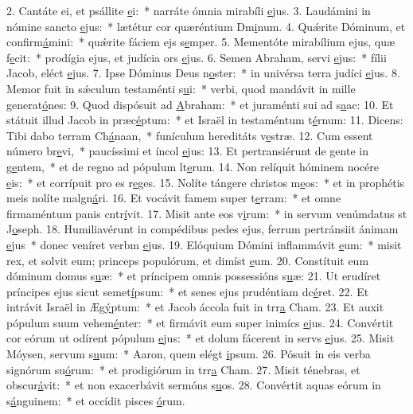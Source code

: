 2. Cantáte ei, et psállite \uline{e}i:~* narráte ómnia mirabíli \uline{e}jus.
3. Laudámini in nómine sancto \uline{e}jus:~* lætétur cor quæréntium Dm\uline{i}num.
4. Quǽrite Dóminum, et confirm\uline{á}mini:~* quǽrite fáciem ejs s\uline{e}mper.
5. Mementóte mirabílium ejus, quæ f\uline{e}cit:~* prodígia ejus, et judícia ors \uline{e}jus.
6. Semen Abraham, servi \uline{e}jus:~* fílii Jacob, eléct \uline{e}jus.
7. Ipse Dóminus Deus n\uline{o}ster:~* in univérsa terra judíci \uline{e}jus.
8. Memor fuit in sǽculum testaménti s\uline{u}i:~* verbi, quod mandávit in mille generat\uline{ó}nes:
9. Quod dispósuit ad \uline{A}braham:~* et juraménti sui ad s\uline{a}ac:
10. Et státuit illud Jacob in præc\uline{é}ptum:~* et Israël in testaméntum t\uline{é}rnum:
11. Dicens: Tibi dabo terram Ch\uline{á}naan,~* funículum hereditáts v\uline{e}stræ.
12. Cum essent número br\uline{e}vi,~* paucíssimi et íncol \uline{e}jus:
13. Et pertransiérunt de gente in g\uline{e}ntem,~* et de regno ad pópulum lt\uline{e}rum.
14. Non relíquit hóminem nocére \uline{e}is:~* et corrípuit pro es r\uline{e}ges.
15. Nolíte tángere christos m\uline{e}os:~* et in prophétis meis nolíte malgn\uline{á}ri.
16. Et vocávit famem super t\uline{e}rram:~* et omne firmaméntum panis cntr\uline{í}vit.
17. Misit ante eos v\uline{i}rum:~* in servum venúmdatus st J\uline{o}seph.
18. Humiliavérunt in compédibus pedes ejus, ferrum pertránsiit ánimam \uline{e}jus~* donec veníret verbm \uline{e}jus.
19. Elóquium Dómini inflammávit \uline{e}um:~* misit rex, et solvit eum; princeps populórum, et dimíst \uline{e}um.
20. Constítuit eum dóminum domus s\uline{u}æ:~* et príncipem omnis possessións s\uline{u}æ:
21. Ut erudíret príncipes ejus sicut semet\uline{í}psum:~* et senes ejus prudéntiam dc\uline{é}ret.
22. Et intrávit Israël in Æg\uline{ý}ptum:~* et Jacob áccola fuit in trr\uline{a} Cham.
23. Et auxit pópulum suum vehem\uline{é}nter:~* et firmávit eum super inimícs \uline{e}jus.
24. Convértit cor eórum ut odírent pópulum \uline{e}jus:~* et dolum fácerent in servs \uline{e}jus.
25. Misit Móysen, servum s\uline{u}um:~* Aaron, quem elégt \uline{i}psum.
26. Pósuit in eis verba signórum su\uline{ó}rum:~* et prodigiórum in trr\uline{a} Cham.
27. Misit ténebras, et obscur\uline{á}vit:~* et non exacerbávit sermóns s\uline{u}os.
28. Convértit aquas eórum in s\uline{á}nguinem:~* et occídit pisces \uline{ó}rum.
